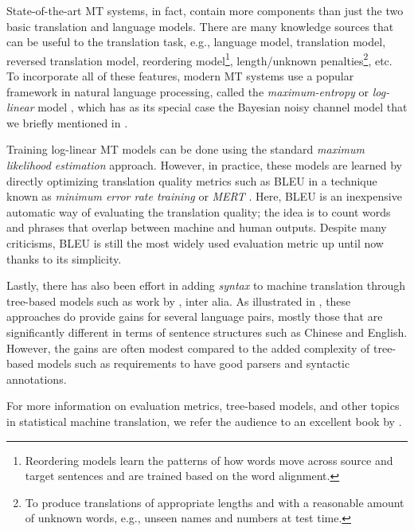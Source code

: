 State-of-the-art MT systems, in fact, contain more components than just the two
basic translation and language models. There are many knowledge
sources that can be useful to the translation task, e.g., language model,
translation model, reversed translation model, reordering
model\footnote{Reordering models learn the patterns of how words move across source
and target sentences and are trained based on the word alignment.},
length/unknown penalties\footnote{To produce translations of appropriate lengths
and with a reasonable amount of unknown words, e.g., unseen names and numbers
at test time.}, etc. To incorporate all of
these features, modern MT systems use a popular framework in natural language
processing, called the {\it maximum-entropy} or
{\it log-linear} model \cite{berger96,och02}, which has as its special case the
Bayesian noisy channel model that we briefly mentioned in .

Training log-linear MT models can be done using the standard {\it maximum
likelihood estimation} approach. However, in practice, these models are learned
by directly optimizing translation quality metrics such as BLEU
\cite{Papineni02bleu} in a technique known as {\it minimum error rate training}
or {\it MERT} \cite{och03mert}. Here, BLEU is an inexpensive automatic way of
evaluating the translation quality; the idea is to count words and phrases that
overlap between machine and human outputs. Despite many criticisms, BLEU is
still the most widely used evaluation metric up until now thanks to its
simplicity. 

Lastly, there has also been effort in
adding {\it syntax} to machine translation through tree-based models such as work by
, inter alia. As illustrated in
, these approaches do provide gains
for several language pairs, mostly those that are significantly different in terms
of sentence structures such as Chinese and English. However,
the gains are often modest compared to the added complexity of tree-based models
such as requirements to have good parsers and syntactic annotations.

For more information on evaluation metrics, tree-based models, and other
topics in statistical machine translation, we refer the audience to an 
excellent book by .



